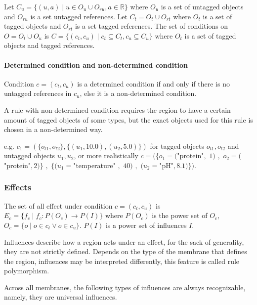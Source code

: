 \documentclass[9pt,a4paper,twoside]{article}
\begin{document}
            Let $C_u = \{(u, a) \mid u \in O_u \cup O_{ru}, a \in \mathbb{R}\}$ where $O_u$ is a set of untagged objects and $O_{ru}$ is a set untagged references.
            Let $C_t = O_t \cup O_{rt}$ where $O_t$ is a set of tagged objects and $O_{rt}$ is a set tagged references.
            The set of conditions on $O = O_t \cup O_u$ is $C = \{(c_t, c_u) \mid c_t \subseteq C_t, c_u \subseteq C_u\}$ 
            where $O_t$ is a set of tagged objects and tagged references.

\paragraph{Determined condition and non-determined condition}
            Condition $c=(c_t, c_u)$ is a determined condition if and only if there is no untagged references in
            $c_u$, else it is a non-determined condition.  
            
            A rule with non-determined condition requires the region to have a certain amount of tagged objects of some types, 
            but the exact objects used for this rule is chosen in a non-determined way.
            
            e.g. 
            $c_1 = (\{o_{t1}, o_{t2}\}, \{(u_1, 10.0), (u_2, 5.0)\})$ for tagged objects $o_{t1}, o_{t2}$ and untagged objects $u_1, u_2$,
            or more realistically
            $c = (\{ o_1=($"protein"$,$ $1)$ $,$ $ o_2=($"protein"$,$$ 2) \}$ $,$ $ \{(u_1=$"temperature" $,$
            $40)$ $,$ $ (u_2=$"pH"$,$$ 8.1)\})$.
            
\subsubsection{Effects}
        
            The set of all effect under condition $c=(c_t, c_u)$ is $E_c = \{ f_c \mid f_c: P(O_c) \rightarrow P(I) \}$  where $P(O_c)$ is the power set of 
            $O_c$, $O_c = \{o \mid o \in c_t \vee o \in c_u\}$. $P(I)$ is a power set of influences $I$. 

            Influences describe how a region acts under an effect, for the sack of generality, they are not strictly defined. 
            Depends on the type of the membrane that defines the region, influences may be interpreted differently, this feature is called rule polymorphism. 
            
            Across all membranes, the following types of influences are always recognizable, namely, they are universal influences.
\end{document}
